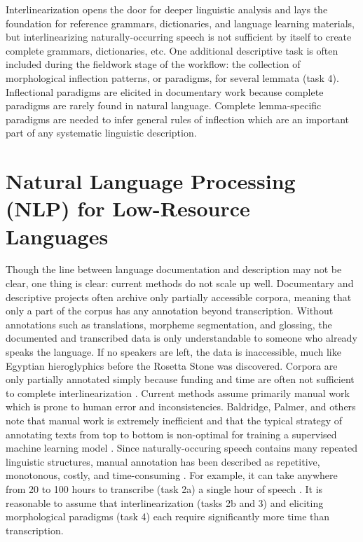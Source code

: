 Interlinearization opens the door for deeper linguistic analysis and lays the foundation for reference grammars, dictionaries, and language learning materials, but interlinearizing naturally-occurring speech is not sufficient by itself to create complete grammars, dictionaries, etc. One additional descriptive task is often included during the fieldwork stage of the workflow: the collection of morphological inflection patterns, or paradigms, for several lemmata (task 4). Inflectional paradigms are elicited in documentary work because complete paradigms are rarely found in natural language. Complete lemma-specific paradigms are needed to infer general rules of inflection which are an important part of any systematic linguistic description.


\section{Natural Language Processing (NLP) for Low-Resource Languages}

Though the line between language documentation and description may not be clear, one thing is clear: current methods do not scale up well. Documentary and descriptive projects often archive only partially accessible corpora, meaning that only a part of the corpus has any annotation beyond transcription. Without annotations such as translations, morpheme segmentation, and glossing, the documented and transcribed data is only understandable to someone who already speaks the language. If no speakers are left, the data is inaccessible, much like Egyptian hieroglyphics before the Rosetta Stone was discovered. Corpora are only partially annotated simply because funding and time are often not sufficient to complete interlinearization \citep{cox_taking_2019}. Current methods assume primarily manual work which is prone to human error and inconsistencies. Baldridge, Palmer, and others note that manual work is extremely inefficient and that the typical strategy of annotating texts from top to bottom is non-optimal for training a supervised machine learning model \citep{Baldridge06,baldridge_how_2009,palmer_semi-automated_2009}. Since naturally-occuring speech contains many repeated linguistic structures, manual annotation has been described as repetitive, monotonous, costly, and time-consuming \citep{duong_natural_2017,he_humanloop_2016}. For example, it can take anywhere from 20 to 100 hours to transcribe (task 2a) a single hour of speech \citep{seifart_language_2018}. It is reasonable to assume that interlinearization (tasks 2b and 3) and eliciting morphological paradigms (task 4) each require  significantly more time than transcription.  

